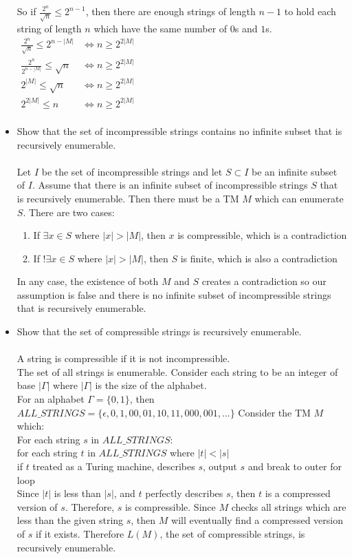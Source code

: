 \documentclass[letterpaper,notitlepage,twoside]{article}
\renewcommand{\iff}{\Leftrightarrow} %
\newcommand\tab[1][1cm]{\hspace*{#1}} %
\begin{document}
\begin{itemize}
So if $\frac{2^n}{\sqrt{n}} \leq 2^{n - 1}$, then there are enough strings of length $n - 1$ to hold each string of length $n$ which have the same number of $0$s and $1$s.\\

$\begin{aligned}
\frac{2^n}{\sqrt{n}} \leq 2^{n - |M|} &\iff n \geq 2^{2|M|} \\
\frac{2^n}{2^{n - |M|}} \leq \sqrt{n} &\iff n \geq 2^{2|M|} \\
2^{|M|} \leq \sqrt{n} &\iff n \geq 2^{2|M|} \\
2^{2|M|} \leq n &\iff n \geq 2^{2|M|} \\
\end{aligned}$

\item Show that the set of incompressible strings contains no infinite subset that is recursively enumerable.\\\\
Let $I$ be the set of incompressible strings and let $S \subset I$ be an infinite subset of $I$. Assume that there is an infinite subset of incompressible strings $S$ that is recursively enumerable. Then there must be a TM $M$ which can enumerate $S$. There are two cases:
\begin{enumerate}
\item If $\exists x \in S$ where $|x| > |M|$, then $x$ is compressible, which is a contradiction
\item If $!\exists x \in S$ where $|x| > |M|$, then $S$ is finite, which is also a contradiction
\end{enumerate}
In any case, the existence of both $M$ and $S$ creates a contradiction so our assumption is false and there is no infinite subset of incompressible strings that is recursively enumerable.

\item Show that the set of compressible strings is recursively enumerable.\\\\
A string is compressible if it is not incompressible.\\
The set of all strings is enumerable. Consider each string to be an integer of base $|\Gamma|$ where $|\Gamma|$ is the size of the alphabet. \\
For an alphabet $\Gamma = \{0, 1\}$, then $ALL\_STRINGS = \{\epsilon, 0, 1, 00, 01, 10, 11, 000, 001,...\}$
Consider the TM $M$ which: \\
For each string $s$ in $ALL\_STRINGS$: \\
	\tab for each string $t$ in $ALL\_STRINGS$ where $|t| < |s|$ \\
		\tab\tab if $t$ treated as a Turing machine, describes $s$, output $s$ and break to outer for loop \\		
Since $|t|$ is less than $|s|$, and $t$ perfectly describes $s$, then $t$ is a compressed version of $s$. Therefore, $s$ is compressible. Since $M$ checks all strings which are less than the given string $s$, then $M$ will eventually find a compressed version of $s$ if it exists. Therefore $L(M)$, the set of compressible strings, is recursively enumerable.


\end{itemize}
\end{document}
